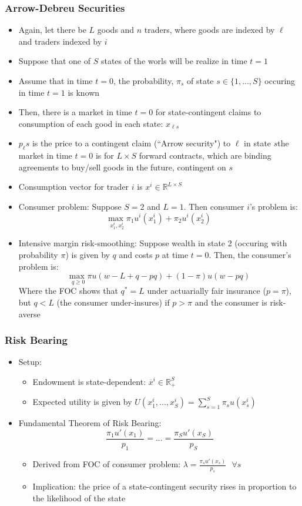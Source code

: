 \documentclass{article}
\newcommand{\R}{\mathbb{R}}
\newcommand{\usmax}[1]{\underset{#1}{\text{max }}}
\newcommand{\olx}{\overline{x}}
\newcommand{\blue}[1]{{\color{blue}#1}}
\begin{document}
\subsubsection{Arrow-Debreu Securities}
\begin{itemize}
	\item Again, let there be $L$ goods and $n$ traders, where goods are indexed by $\ell$ and traders indexed by $i$
	\item Suppose that one of $S$ states of the worls will be realize in time $t=1$
	\item Assume that in time ${t=0}$, the probability, $\pi_s$ of state ${s\in\{1,...,S\}}$ occuring in time ${t=1}$ is known
	\item Then, there is a market in time ${t=0}$ for \blue{state-contingent claims} to consumption of each good in each state: $x_{\ell s}$
	\item $p_\ell s$ is the price to a contingent claim (``Arrow security") to $\ell$ in state $s$\textemdash the market in time ${t=0}$ is for $L\times S$ forward contracts, which are binding agreements to buy/sell goods in the future, contingent on $s$
	\item Consumption vector for trader $i$ is ${x^i\in\R^{L\times S}}$
	\item \blue{Consumer problem}: Suppose $S=2$ and $L=1$. Then consumer $i$'s problem is:
		\[
			\usmax{x^i_1,x^i_2}\pi_1u^i(x^i_1) + \pi_2u^i(x^i_2)
		\]
	\item \blue{Intensive margin risk-smoothing:} Suppose wealth in state 2 (occuring with probability $\pi$) is given by $q$ and costs $p$ at time ${t=0}$. Then, the consumer's problem is:
		\[
			\usmax{q\geq0}\pi u(w-L+q-pq) + (1-\pi)u(w-pq)
		\]
		Where the FOC shows that $q^*=L$ under actuarially fair insurance ($p=\pi$), but $q<L$ (the consumer under-insures) if $p>\pi$ and the consumer is risk-averse
\end{itemize}

\subsubsection{Risk Bearing}
\begin{itemize}
	\item Setup:
		\begin{itemize}
			\item Endowment is state-dependent: $\olx^i\in\R_+^S$
			\item Expected utility is given by $U(x^i_1,...,x^i_S) = \sum_{s=1}^S\pi_su(x^i_s)$
		\end{itemize}
	\item \blue{Fundamental Theorem of Risk Bearing:}
		\[
			\frac{\pi_1u'(x_1)}{p_1} = ... = \frac{\pi_Su'(x_S)}{p_S}
		\]
		\begin{itemize}
			\item Derived from FOC of consumer problem: ${\lambda = \frac{\pi_su'(x_s)}{p_s}\text{ }\forall s}$
			\item Implication: the price of a state-contingent security rises in proportion to the likelihood of the state
		\end{itemize}
\end{itemize}
\end{document}
